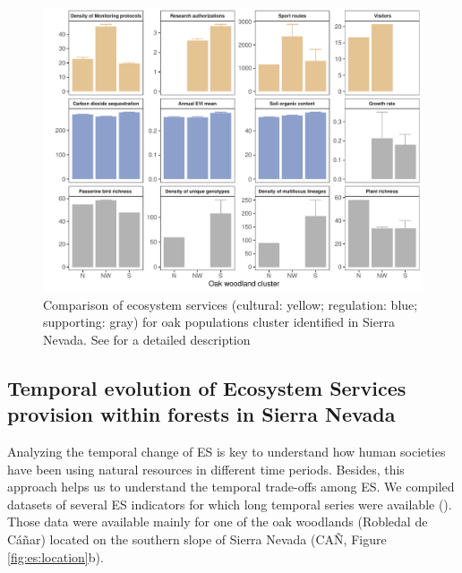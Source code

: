 \begin{figure}
    \centering
    \includegraphics[width=\textwidth]{img/es/es-plotSN.pdf}\caption{Comparison of ecosystem services (cultural: yellow; regulation: blue; supporting: gray) for oak populations cluster identified in Sierra Nevada. See  for a detailed description 
}\label{fig:es:oak-compare}
\end{figure}

\subsection{Temporal evolution of Ecosystem Services provision within \Qp forests in Sierra Nevada}\label{sec:es:temporal} 
Analyzing the temporal change of ES is key to understand how human societies have been using natural resources in different time periods. Besides, this approach helps us to understand the temporal trade-offs among ES. We compiled datasets of several ES indicators for which long temporal series were available (). Those data were available mainly for one of the oak woodlands (Robledal de Cáñar) located on the southern slope of Sierra Nevada (CAÑ, Figure \ref{fig:es:location}b). 

